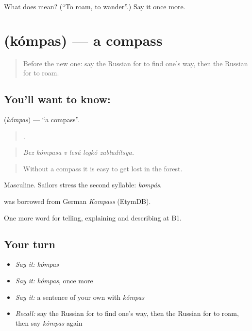\begin{tcolorbox}[breakable,colback=teal!4,colframe=teal!35!black,title={Before you move on}]
What does  mean? (\textquotedblleft{}To roam, to wander\textquotedblright{}.) Say it once more.
\end{tcolorbox}
\section[\texorpdfstring{\ru{компас} (kómpas)}{компас (kómpas)}]{ (kómpas) — a compass}

\label{lesson:RU-C437-kompas}



\begin{quote}
Before the new one: say the Russian for to find one's way, then the Russian for to roam.
\end{quote}

\subsection*{You'll want to know: }
\textbf{} (\emph{kómpas}) — \textquotedblleft{}a compass\textquotedblright{}.

\begin{quote}
     .
\end{quote}

\begin{quote}
\emph{Bez kómpasa v lesú legkó zabludítsya.}
\end{quote}

\begin{quote}
Without a compass it is easy to get lost in the forest.
\end{quote}

Masculine. Sailors stress the second syllable: \emph{kompás}.

\begin{cousinweb}
\emph{} was borrowed from German \emph{Kompass} (EtymDB).
\end{cousinweb}

\begin{grammarlens}[title={What you've built}]
One more word for telling, explaining and describing at B1.
\end{grammarlens}

\subsection*{Your turn}
\begin{itemize}
\raggedright
  \item \emph{Say it:} \emph{kómpas}
  \item \emph{Say it:} \emph{kómpas}, once more
  \item \emph{Say it:} a sentence of your own with \emph{kómpas}
  \item \emph{Recall:} say the Russian for to find one's way, then the Russian for to roam, then say \emph{kómpas} again
\end{itemize}

